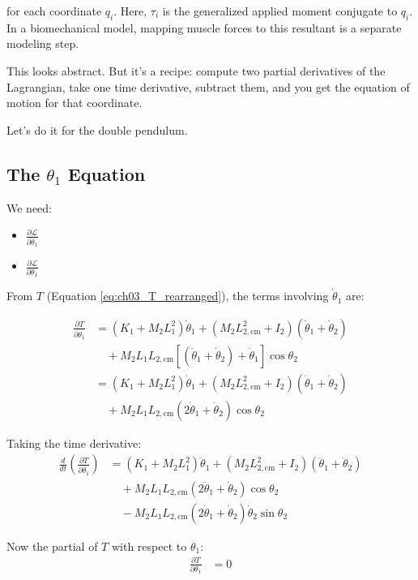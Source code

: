 for each coordinate $q_i$. Here, $\tau_i$ is the generalized applied moment conjugate to $q_i$. In a biomechanical model, mapping muscle forces to this resultant is a separate modeling step.

This looks abstract. But it's a recipe: compute two partial derivatives of the Lagrangian, take one time derivative, subtract them, and you get the equation of motion for that coordinate.

Let's do it for the double pendulum.

\subsection*{The $\theta_1$ Equation}

We need:
\begin{itemize}
\item $\frac{\partial \mathcal{L}}{\partial \dot{\theta}_1}$
\item $\frac{\partial \mathcal{L}}{\partial \theta_1}$
\end{itemize}

From $T$ (Equation \ref{eq:ch03_T_rearranged}), the terms involving $\dot{\theta}_1$ are:

\begin{align}
\frac{\partial T}{\partial \dot{\theta}_1} &= (K_1 + M_2 L_1^2) \dot{\theta}_1 + (M_2 L_{2,\text{cm}}^2 + I_2) (\dot{\theta}_1 + \dot{\theta}_2) \\
&\quad + M_2 L_1 L_{2,\text{cm}} [(\dot{\theta}_1 + \dot{\theta}_2) + \dot{\theta}_1] \cos \theta_2 \\
&= (K_1 + M_2 L_1^2) \dot{\theta}_1 + (M_2 L_{2,\text{cm}}^2 + I_2) (\dot{\theta}_1 + \dot{\theta}_2) \\
&\quad + M_2 L_1 L_{2,\text{cm}} (2 \dot{\theta}_1 + \dot{\theta}_2) \cos \theta_2
\end{align}

Taking the time derivative:
\begin{align}
\frac{d}{dt} \left( \frac{\partial T}{\partial \dot{\theta}_1} \right) &= (K_1 + M_2 L_1^2) \ddot{\theta}_1 + (M_2 L_{2,\text{cm}}^2 + I_2) (\ddot{\theta}_1 + \ddot{\theta}_2) \\
&\quad + M_2 L_1 L_{2,\text{cm}} (2 \ddot{\theta}_1 + \ddot{\theta}_2) \cos \theta_2 \\
&\quad - M_2 L_1 L_{2,\text{cm}} (2 \dot{\theta}_1 + \dot{\theta}_2) \dot{\theta}_2 \sin \theta_2
\end{align}

Now the partial of $T$ with respect to $\theta_1$:
\begin{align}
\frac{\partial T}{\partial \theta_1} &= 0
\end{align}

